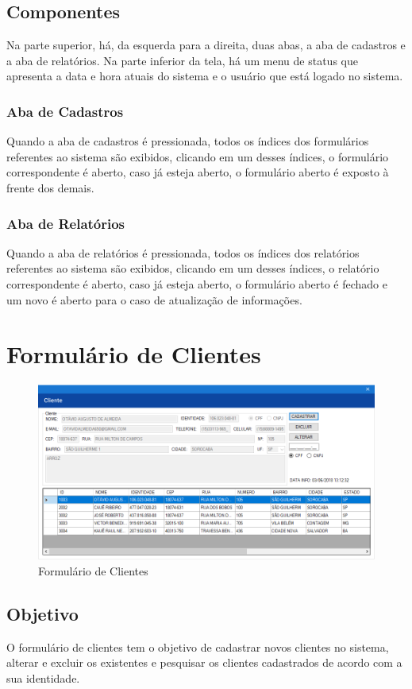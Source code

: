 \documentclass[
	article,			%
	12pt,				%
	oneside,			%
	a4paper,			%
	english,			%
	brazil,				%
	sumario=tradicional
	]{abntex2}
\begin{document}
		\subsection{Componentes}
		Na parte superior, há, da esquerda para a direita, duas abas, a aba de cadastros e a aba de relatórios.
		Na parte inferior da tela, há um menu de status que apresenta a data e hora atuais do sistema e o usuário que está logado no sistema.
		\subsubsection{Aba de Cadastros}
		Quando a aba de cadastros é pressionada, todos os índices dos formulários referentes ao sistema são exibidos, clicando em um desses índices, o formulário correspondente é aberto, caso já esteja aberto, o formulário aberto é exposto à frente dos demais.
		\subsubsection{Aba de Relatórios}
		Quando a aba de relatórios é pressionada, todos os índices dos relatórios referentes ao sistema são exibidos, clicando em um desses índices, o relatório correspondente é aberto, caso já esteja aberto, o formulário aberto é fechado e um novo é aberto para o caso de atualização de informações.
	\newpage
	\section{Formulário de Clientes}
		\begin{figure}[!htb]
			\centering
			\includegraphics[scale=0.6]{./Figuras/FrmCliente.png}
			\caption{Formulário de Clientes}
		\end{figure}	
		\subsection{Objetivo}
		O formulário de clientes tem o objetivo de cadastrar novos clientes no sistema, alterar e excluir os existentes e pesquisar os clientes cadastrados de acordo com a sua identidade.
\end{document}
